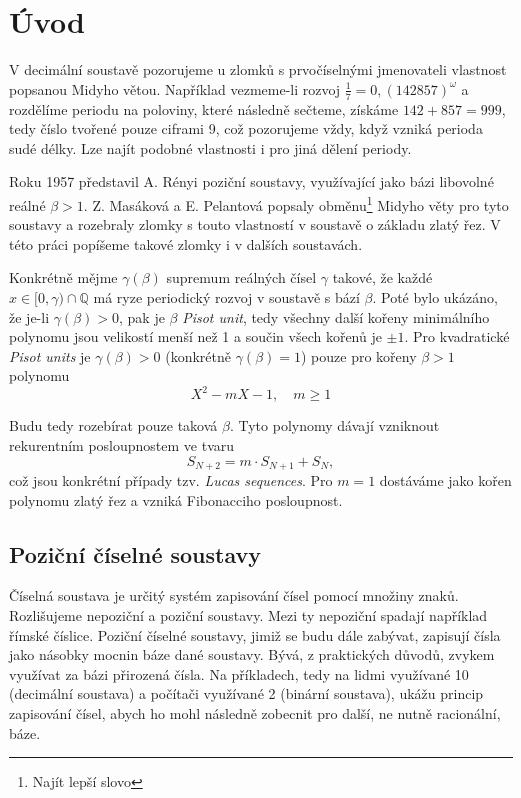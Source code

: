 \documentclass{article}
\theoremstyle{definition}
\theoremstyle{definition}
\theoremstyle{remark}
\numberwithin{equation}{section}
\begin{document}
\newpage

\section{Úvod}

V decimální soustavě pozorujeme u zlomků s prvočíselnými jmenovateli vlastnost popsanou Midyho větou. Například vezmeme-li rozvoj $\frac{1}{7} = 0,(142857)^\omega$ a rozdělíme periodu na poloviny, které následně sečteme, získáme $142 + 857 = 999$, tedy číslo tvořené pouze ciframi 9, což pozorujeme vždy, když vzniká perioda sudé délky. Lze najít podobné vlastnosti i pro jiná dělení periody.

Roku 1957 představil A. Rényi \cite{Renyi} poziční soustavy, využívající jako bázi libovolné reálné $\beta > 1$. Z. Masáková a E. Pelantová \cite{Midy} popsaly obměnu\footnote{Najít lepší slovo} Midyho věty pro tyto soustavy a rozebraly zlomky s touto vlastností v soustavě o základu zlatý řez. V této práci popíšeme takové zlomky i v dalších soustavách.

Konkrétně mějme $\gamma(\beta)$ supremum reálných čísel $\gamma$ takové, že každé $x \in [0, \gamma) \cap \mathbb{Q}$ má ryze periodický rozvoj v soustavě s bází $\beta$. Poté bylo ukázáno, že je-li $\gamma(\beta) > 0$, pak je $\beta$ \textit{Pisot unit}, tedy všechny další kořeny minimálního polynomu jsou velikostí menší než 1 a součin všech kořenů je $\pm 1$. Pro kvadratické \textit{Pisot units} je $\gamma(\beta) > 0$ (konkrétně $\gamma(\beta) = 1$) pouze pro kořeny $\beta > 1$ polynomu $$X^2 - mX - 1, \quad m \geq 1$$

Budu tedy rozebírat pouze taková $\beta$. Tyto polynomy dávají vzniknout rekurentním posloupnostem ve tvaru $$S_{N + 2} = m\cdot S_{N + 1} + S_N,$$ což jsou konkrétní případy tzv. \textit{Lucas sequences}. Pro $m = 1$ dostáváme jako kořen polynomu zlatý řez a vzniká Fibonacciho posloupnost.

\subsection{Poziční číselné soustavy}

Číselná soustava je určitý systém zapisování čísel pomocí množiny znaků. Rozlišujeme nepoziční a poziční soustavy. Mezi ty nepoziční spadají například římské číslice. Poziční číselné soustavy, jimiž se budu dále zabývat, zapisují čísla jako násobky mocnin báze dané soustavy. Bývá, z praktických důvodů, zvykem využívat za bázi přirozená čísla. Na příkladech, tedy na lidmi využívané 10 (decimální soustava) a počítači využívané 2 (binární soustava), ukážu princip zapisování čísel, abych ho mohl následně zobecnit pro další, ne nutně racionální, báze.\\
\end{document}
